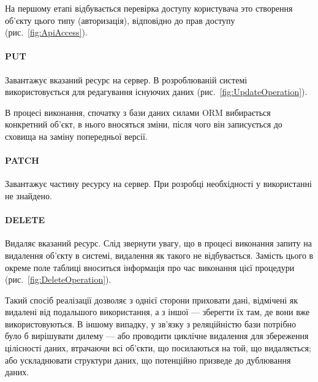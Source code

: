На першому етапі відбувається перевірка доступу користувача это створення об’єкту цього типу (авторизація), відповідно до прав доступу (рис.~\ref{fig:ApiAccess}).

\paragraph{PUT}

Завантажує вказаний ресурс на сервер. В розроблюваній системі використовується для редагування існуючих даних (рис.~\ref{fig:UpdateOperation}). 

В процесі виконання, спочатку з бази даних силами ORM вибирається конкретний об’єкт, в нього вносяться зміни, після чого він записується до сховища на заміну попередньої версії.

\paragraph{PATCH}

Завантажує частину ресурсу на сервер. При розробці необхідності у використанні не знайдено.

\paragraph{DELETE}

Видаляє вказаний ресурс.
Слід звернути увагу, що в процесі виконання запиту на видалення об’єкту в системі, видалення як такого не відбувається. Замість цього в окреме поле таблиці вноситься інформація про час виконання цієї процедури (рис.~\ref{fig:DeleteOperation}).

Такий спосіб реалізації дозволяє з однієї сторони приховати дані, відмічені як видалені від подальшого використання, а з іншої — зберегти їх там, де вони вже використовуються. В іншому випадку, у зв’язку з реляційністю бази потрібно було б вирішувати дилему — або проводити циклічне видалення для збереження цілісності даних, втрачаючи всі об’єкти, що посилаються на той, що видаляється; або ускладнювати структури даних, що потенційно призведе до дублювання даних.
